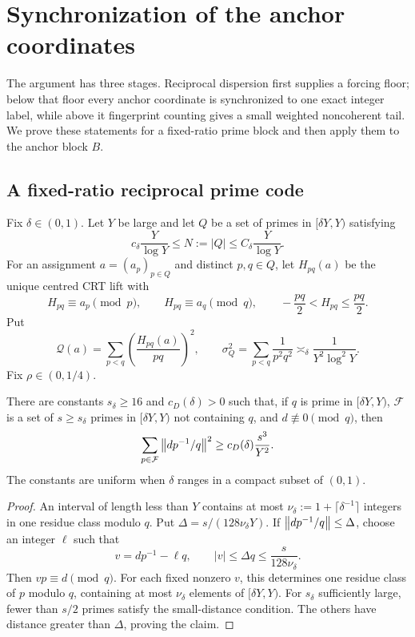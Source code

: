 \section{Synchronization of the anchor coordinates}
\label{sec:anchor-synchronization}

The argument has three stages. Reciprocal dispersion first supplies a forcing floor; below that floor every anchor coordinate is synchronized to one exact integer label, while above it fingerprint counting gives a small weighted noncoherent tail. We prove these statements for a fixed-ratio prime block and then apply them to the anchor block $B$.

\subsection{A fixed-ratio reciprocal prime code}

Fix $\delta\in(0,1)$. Let $Y$ be large and let $Q$ be a set of primes in $[\delta Y,Y)$ satisfying
\[
 c_\delta\frac{Y}{\log Y}\leq N:=|Q|\leq C_\delta\frac{Y}{\log Y}.
\]
For an assignment $a=(a_p)_{p\in Q}$ and distinct $p,q\in Q$, let $H_{pq}(a)$ be the unique centred CRT lift with
\[
 H_{pq}\equiv a_p\pmod p,\qquad H_{pq}\equiv a_q\pmod q,\qquad -\frac{pq}{2}<H_{pq}\leq\frac{pq}{2}.
\]
Put
\[
 \mathcal Q(a)=\sum_{p<q}\left(\frac{H_{pq}(a)}{pq}\right)^2,
 \qquad
 \sigma_Q^2=\sum_{p<q}\frac1{p^2q^2}\asymp_\delta\frac1{Y^2\log^2Y}.
\]
Fix $\rho\in(0,1/4)$.

\begin{lemma}
\label{lem:reciprocal-dispersion}
There are constants $s_\delta\geq16$ and $c_D(\delta)>0$ such that, if $q$ is prime in $[\delta Y,Y)$, $\mathcal F$ is a set of $s\geq s_\delta$ primes in $[\delta Y,Y)$ not containing $q$, and $d\not\equiv0\pmod q$, then
\[
 \sum_{p\in\mathcal F}\left\lVert d p^{-1}/q\right\rVert^2\geq c_D(\delta)\frac{s^3}{Y^2}.
\]
The constants are uniform when $\delta$ ranges in a compact subset of $(0,1)$.
\end{lemma}
\begin{proof}
An interval of length less than $Y$ contains at most $\nu_\delta:=1+\lceil\delta^{-1}\rceil$ integers in one residue class modulo $q$. Put $\Delta=s/(128\nu_\delta Y)$. If $\left\lVert dp^{-1}/q\right\rVert\leq\Delta$, choose an integer $\ell$ such that
\[
 v=dp^{-1}-\ell q,\qquad |v|\leq\Delta q\leq\frac{s}{128\nu_\delta}.
\]
Then $vp\equiv d\pmod q$. For each fixed nonzero $v$, this determines one residue class of $p$ modulo $q$, containing at most $\nu_\delta$ elements of $[\delta Y,Y)$. For $s_\delta$ sufficiently large, fewer than $s/2$ primes satisfy the small-distance condition. The others have distance greater than $\Delta$, proving the claim.
\end{proof}

